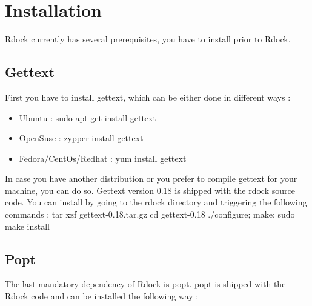 \clearpage 
\section{Installation}  \label{Installation}
Rdock currently has several prerequisites, you have to install prior to Rdock. 
\subsection{Gettext}
First you have to install gettext, which can be either done in different ways :

\begin{itemize}
\item Ubuntu : sudo apt-get install gettext
\item OpenSuse : zypper install gettext
\item Fedora/CentOs/Redhat : yum install gettext
\end{itemize}

In case you have another distribution or you prefer to compile gettext for your machine, you can do so. Gettext version 0.18 is shipped with the rdock source code. You can install by going to the rdock directory and triggering the following commands :\newline\newline
tar xzf gettext-0.18.tar.gz\newline
cd gettext-0.18\newline
./configure; \newline make; \newline sudo make install\newline

\subsection{Popt}
The last mandatory dependency of Rdock is popt. popt is shipped with the Rdock code and can be installed the following way : \newline\newline
